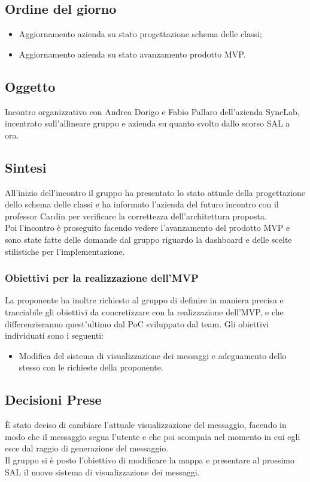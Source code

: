 \documentclass[10pt]{article}
\begin{document}
\subsection{Ordine del giorno}
\begin{itemize}
    \item Aggiornamento azienda su stato progettazione schema delle classi;
    \item Aggiornamento azienda su stato avanzamento prodotto MVP.
\end{itemize}

\subsection{Oggetto}
Incontro organizzativo con Andrea Dorigo e Fabio Pallaro dell'azienda SyncLab, incentrato sull'allineare gruppo e azienda su quanto svolto dallo scorso SAL a ora.

\subsection{Sintesi}
All'inizio dell'incontro il gruppo ha presentato lo stato attuale della progettazione dello schema delle classi e ha informato l'azienda del futuro incontro con il professor Cardin per verificare la correttezza dell'architettura proposta.\\
Poi l'incontro è proseguito facendo vedere l'avanzamento del prodotto MVP e sono state fatte delle domande dal gruppo riguardo la dashboard e delle scelte stilistiche per l'implementazione.\\

\subsubsection{Obiettivi per la realizzazione dell'MVP}
La proponente ha inoltre richiesto al gruppo di definire in maniera precisa e tracciabile gli obiettivi da concretizzare con la realizzazione dell'MVP, e che differenzieranno
quest'ultimo dal PoC sviluppato dal team. Gli obiettivi individuati sono i seguenti:
\begin{itemize}
    \item Modifica del sistema di visualizzazione dei messaggi e adeguamento dello stesso con le richieste della proponente.
\end{itemize}

\subsection{Decisioni Prese}
È stato deciso di cambiare l'attuale visualizzazione del messaggio, facendo in modo che il messaggio segua l'utente e che poi scompaia nel momento in cui egli esce dal raggio di generazione del messaggio.\\
Il gruppo si è posto l'obiettivo di modificare la mappa e presentare al prossimo SAL il nuovo sistema di visualizzazione dei messaggi.\\
\end{document}
